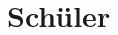 \cleardoublepage
\section{Schüler}
\begin{multicols}{2}
\vspace*{-2.3em}
\secttoc
\end{multicols}

\newpage



